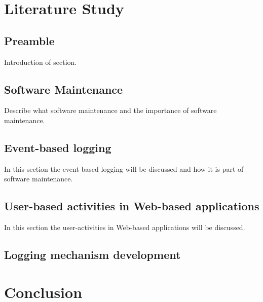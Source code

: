\newpage
\section{Literature Study}

\subsection{Preamble}
Introduction of section.

\subsection{Software Maintenance}
Describe what software maintenance and the importance of software maintenance.

\subsection{Event-based logging}
In this section the event-based logging will be discussed and how it is part of software maintenance. 

\subsection{User-based activities in Web-based applications}
In this section the user-activities in Web-based applications will be discussed.

\subsection{Logging mechanism development}

\section{Conclusion}

